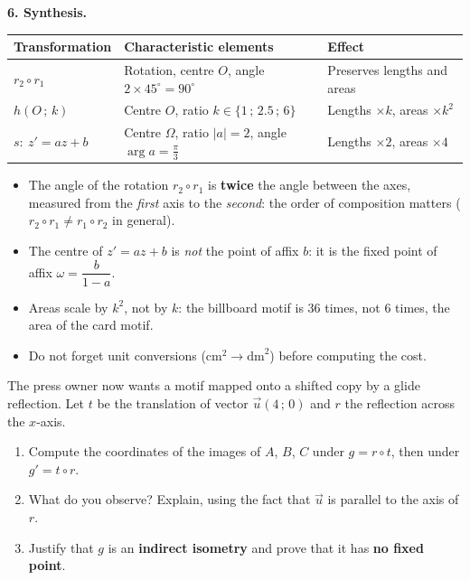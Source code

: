 \documentclass[11pt]{article}
\begin{document}
\textbf{6. Synthesis.}\par
\begin{center}
\begin{tabularx}{\linewidth}{|l|X|X|}
\hline
\rowcolor{popblueL} \textbf{Transformation} & \textbf{Characteristic elements} & \textbf{Effect} \\
\hline
$r_2 \circ r_1$ & Rotation, centre $O$, angle $2 \times 45^{\circ} = 90^{\circ}$ & Preserves lengths and areas \\
\hline
$h(O\,;\,k)$ & Centre $O$, ratio $k \in \{1\,;\,2.5\,;\,6\}$ & Lengths $\times k$, areas $\times k^{2}$ \\
\hline
$s:\ z' = az + b$ & Centre $\Omega$, ratio $|a| = 2$, angle $\arg a = \frac{\pi}{3}$ & Lengths $\times 2$, areas $\times 4$ \\
\hline
\end{tabularx}
\end{center}

\begin{attention}
\begin{itemize}
\item The angle of the rotation $r_2 \circ r_1$ is \textbf{twice} the angle between the axes, measured from the \emph{first} axis to the \emph{second}: the order of composition matters ($r_2 \circ r_1 \neq r_1 \circ r_2$ in general).
\item The centre of $z' = az + b$ is \emph{not} the point of affix $b$: it is the fixed point of affix $\omega = \dfrac{b}{1-a}$.
\item Areas scale by $k^{2}$, not by $k$: the billboard motif is $36$ times, not $6$ times, the area of the card motif.
\item Do not forget unit conversions ($\mathrm{cm}^2 \to \mathrm{dm}^2$) before computing the cost.
\end{itemize}
\end{attention}

\begin{exercice}
The press owner now wants a motif mapped onto a shifted copy by a glide reflection. Let $t$ be the translation of vector $\vec{u}(4\,;\,0)$ and $r$ the reflection across the $x$-axis.
\begin{enumerate}
\item Compute the coordinates of the images of $A$, $B$, $C$ under $g = r \circ t$, then under $g' = t \circ r$.
\item What do you observe? Explain, using the fact that $\vec{u}$ is parallel to the axis of $r$.
\item Justify that $g$ is an \textbf{indirect isometry} and prove that it has \textbf{no fixed point}.
\end{enumerate}
\end{exercice}
\end{document}
